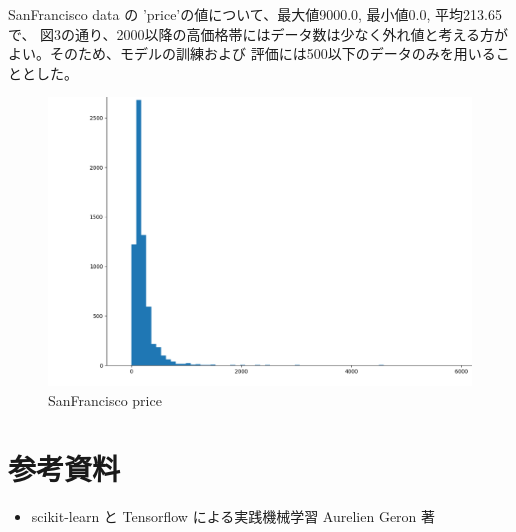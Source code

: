 \documentclass{jsarticle}
\begin{document}
SanFrancisco data の 'price'の値について、最大値9000.0, 最小値0.0, 平均213.65で、
図3の通り、2000以降の高価格帯にはデータ数は少なく外れ値と考える方がよい。そのため、モデルの訓練および
評価には500以下のデータのみを用いることとした。
\begin{figure}[!h]
\includegraphics[width=18cm]{prices.png}
\caption{SanFrancisco price}
\end{figure}

\section{参考資料}
\begin{itemize}
    \item scikit-learn と Tensorflow による実践機械学習 Aurelien Geron 著
\end{itemize}
\end{document}

